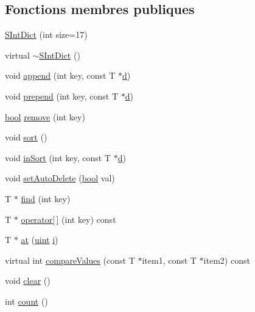 \subsection*{Fonctions membres publiques}
\begin{DoxyCompactItemize}
\item 
\hyperlink{class_s_int_dict_a3285b0a5debceb2190c4f1cc8f8fd78b}{S\+Int\+Dict} (int size=17)
\item 
virtual \hyperlink{class_s_int_dict_a8d2e7da0367e653b432447a9dce7c604}{$\sim$\+S\+Int\+Dict} ()
\item 
void \hyperlink{class_s_int_dict_a829c9e4c9827e765145d150ffb18b1ae}{append} (int key, const T $\ast$\hyperlink{060__command__switch_8tcl_af43f4b1f0064a33b2d662af9f06d3a00}{d})
\item 
void \hyperlink{class_s_int_dict_a394582f93d6d758a477e86f84087c6a6}{prepend} (int key, const T $\ast$\hyperlink{060__command__switch_8tcl_af43f4b1f0064a33b2d662af9f06d3a00}{d})
\item 
\hyperlink{qglobal_8h_a1062901a7428fdd9c7f180f5e01ea056}{bool} \hyperlink{class_s_int_dict_a3e7bf8861e4650f5f958000b86b2312a}{remove} (int key)
\item 
void \hyperlink{class_s_int_dict_ae205d1b7f76cea9da3f117e830bd7dfa}{sort} ()
\item 
void \hyperlink{class_s_int_dict_a16cc84888ede2d895d4df0323608862d}{in\+Sort} (int key, const T $\ast$\hyperlink{060__command__switch_8tcl_af43f4b1f0064a33b2d662af9f06d3a00}{d})
\item 
void \hyperlink{class_s_int_dict_aa847c843b8f2509d2021d8db470aa14f}{set\+Auto\+Delete} (\hyperlink{qglobal_8h_a1062901a7428fdd9c7f180f5e01ea056}{bool} val)
\item 
T $\ast$ \hyperlink{class_s_int_dict_a5b08deebe24072f66bdce4fed2a3863d}{find} (int key)
\item 
T $\ast$ \hyperlink{class_s_int_dict_a6c7f1a2ccba55d870e39f6e112316f78}{operator\mbox{[}$\,$\mbox{]}} (int key) const 
\item 
T $\ast$ \hyperlink{class_s_int_dict_a13bbde7f8fdac65c32e670d627fbdeac}{at} (\hyperlink{qglobal_8h_a4d3943ddea65db7163a58e6c7e8df95a}{uint} \hyperlink{060__command__switch_8tcl_a8c90afd4641b25be86bd09983c3cbee0}{i})
\item 
virtual int \hyperlink{class_s_int_dict_aeb6a4aad9d10d7c48ce4a43f8d72c76f}{compare\+Values} (const T $\ast$item1, const T $\ast$item2) const 
\item 
void \hyperlink{class_s_int_dict_ab86a29e18447f3f5347bb29478a2e8f4}{clear} ()
\item 
int \hyperlink{class_s_int_dict_a2c5c2a415a61ab3466dabdb1bc441ad7}{count} ()
\end{DoxyCompactItemize}
